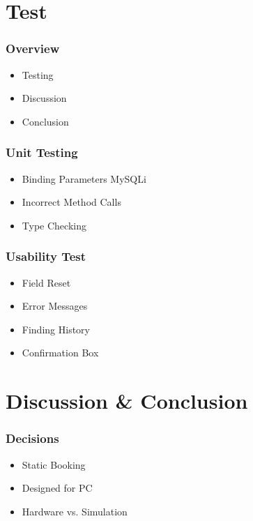 \section{Test}

\begin{frame}
\frametitle{Overview}
\begin{itemize}
	\item Testing
	\item Discussion
	\item Conclusion
\end{itemize}	
\end{frame}

\begin{frame}
\frametitle{Unit Testing}
\begin{itemize}
	\item Binding Parameters MySQLi
	\item Incorrect Method Calls
	\item Type Checking
\end{itemize}
\end{frame}

\begin{frame}
\frametitle{Usability Test}
\begin{itemize}
	\item Field Reset
	\item Error Messages
	\item Finding History
	\item Confirmation Box
\end{itemize}
\end{frame}

\section{Discussion \& Conclusion}
\begin{frame}
\frametitle{Decisions}
\begin{itemize}
	\item Static Booking
	\item Designed for PC
	\item Hardware vs. Simulation
\end{itemize}
\end{frame}

